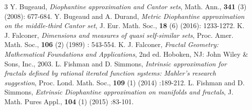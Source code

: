 \documentclass[12pt]{article}
\makeatletter
\theoremstyle{definition}
\newcommand{\Rmnum}[1]{\expandafter\@slowromancap\romannumeral #1@}
\theoremstyle{remark}
\renewcommand{\emph}[1]{{\it#1}}
\makeatother
\begin{document}
\begin{thebibliography}{3}
 Y. Bugeaud, \emph{Diophantine approximation and Cantor sets}, Math. Ann., \textbf{341} (3)  (2008): 677-684.
 Y. Bugeaud and A. Durand, \emph{Metric Diophantine approximation on the middle-third Cantor set}, J. Eur. Math. Soc., \textbf{18} (6) (2016): 1233-1272.
 K. J. Falconer, \emph{Dimensions and measures of quasi self-similar sets}, Proc. Amer. Math. Soc.,  \textbf{106} (2) (1989) : 543-554.
 K. J. Falconer, \emph{Fractal Geometry: Mathematical Foundations and Applications}, 2nd ed. Hoboken, NJ: John Wiley \& Sons, Inc., 2003.
 L. Fishman and D. Simmons, \emph{Intrinsic approximation for fractals defined by rational iterated function
systems: Mahler's research suggestion}, Proc. Lond. Math. Soc., \textbf{109} (1) (2014) :189-212.
 L. Fishman and D. Simmons, \emph{Extrinsic Diophantine approximation on manifolds and fractals}, J. Math. Pures
Appl., \textbf{104} (1) (2015) :83-101.

\end{thebibliography}
\end{document}

